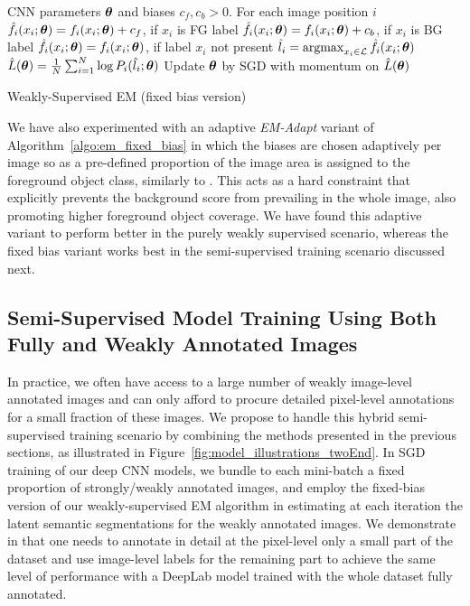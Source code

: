\begin{algorithm}[tbp!]
  \centering
  \begin{algorithmic}[1]
    \algrenewcommand{}
    \Require CNN parameters $\boldsymbol{\theta}$ and biases $c_f, c_b > 0$.
    \algrenewcommand{}
    \Require For each image position $i$
    \State $\hat{f}_i (x_i; \boldsymbol{\theta}) = f_i(x_i; \boldsymbol{\theta}) + c_f$, if $x_i$ is FG label 
    \State $\hat{f}_i (x_i; \boldsymbol{\theta}) = f_i(x_i; \boldsymbol{\theta}) + c_b$, if $x_i$ is BG label 
    \State $\hat{f}_i (x_i; \boldsymbol{\theta}) = f_i(x_i; \boldsymbol{\theta})$, if label $x_i$ not present
    \State $\hat{l}_i = \mathop{\mathrm{argmax}}_{x_i \in \mathcal{L}} \hat{f}_i (x_i; \boldsymbol{\theta})$ 
    \algrenewcommand{}
    \Require
    \State $\hat{L}(\boldsymbol{\theta}) = \frac{1}{N} \sum_{i = 1}^N \log P_i(\hat{l}_i; \boldsymbol{\theta})$ 
    \State Update $\boldsymbol{\theta}$ by SGD with momentum on $\hat{L}(\boldsymbol{\theta})$
    \end{algorithmic}
  \caption{Weakly-Supervised EM (fixed bias version)}
  \label{algo:em_fixed_bias}
\end{algorithm}

We have also experimented with an adaptive \textsl{EM-Adapt} variant of
Algorithm~\ref{algo:em_fixed_bias} in which the biases are chosen
adaptively per image so as a pre-defined proportion of the image area
is assigned to the foreground object class, similarly to
\citet{kuck2005individuals}. This acts as a hard constraint that
explicitly prevents the background score from prevailing in the whole
image, also promoting higher foreground object coverage. We have found
this adaptive variant to perform better in the purely weakly
supervised scenario, whereas the fixed bias variant works best in the
semi-supervised training scenario discussed next.

\subsection{Semi-Supervised Model Training Using Both Fully and Weakly Annotated Images}
\label{sec:train_semi}

In practice, we often have access to a large number of weakly
image-level annotated images and can only afford to procure detailed
pixel-level annotations for a small fraction of these images. We
propose to handle this hybrid semi-supervised training scenario by
combining the methods presented in the previous sections, as
illustrated in Figure~\ref{fig:model_illustrations_twoEnd}. In SGD
training of our deep CNN models, we bundle to each mini-batch a fixed
proportion of strongly/weakly annotated images, and employ the
fixed-bias version of our weakly-supervised EM algorithm in estimating
at each iteration the latent semantic segmentations for the weakly
annotated images. We demonstrate in  that one
needs to annotate in detail at the pixel-level only a small part of
the dataset and use image-level labels for the remaining part to
achieve the same level of performance with a DeepLab model trained
with the whole dataset fully annotated.

